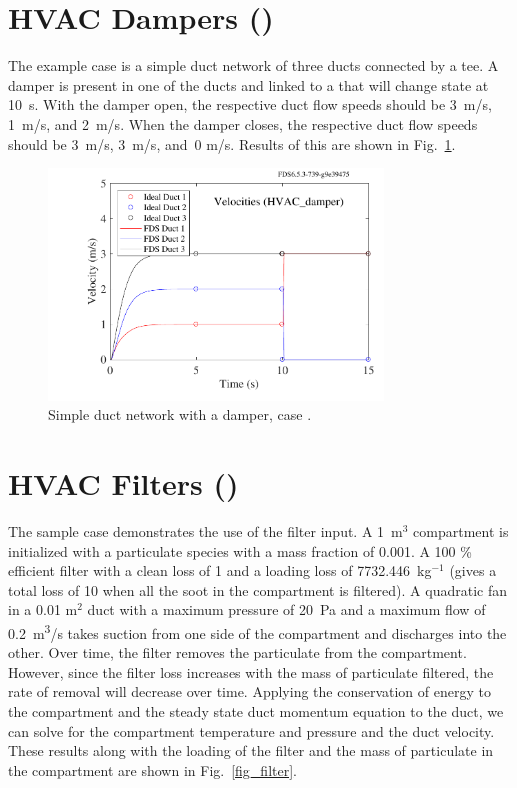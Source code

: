 \documentclass[11pt]{book}
\begin{document}
\clearpage

\section{HVAC Dampers (\texorpdfstring{}{HVAC\_damper})}
\label{HVAC_damper}

The  example case is a simple duct network of three ducts connected by a tee.  A damper is present in one of the ducts and linked to a  that will change state at 10~s.  With the damper open, the respective duct flow speeds should be 3~m/s, 1~m/s, and 2~m/s.  When the damper closes, the respective duct flow speeds should be 3~m/s, 3~m/s, and~0 m/s.  Results of this are shown in Fig.~\ref{fig:HVAC_damper}.

\begin{figure}[h!]
\centering
\includegraphics[width=3.5in]{SCRIPT_FIGURES/HVAC_damper}
\caption[Example case ]{Simple duct network with a damper, case .}
\label{fig:HVAC_damper}
\end{figure}


\clearpage

\section{HVAC Filters (\texorpdfstring{}{HVAC\_filter})}
\label{HVAC_filter}

The sample case  demonstrates the use of the filter input.  A 1~m$^3$ compartment is initialized with a particulate species with a mass fraction of 0.001.  A 100 \% efficient filter with a clean loss of 1 and a loading loss of 7732.446~kg$^{-1}$ (gives a total loss of 10 when all the soot in the compartment is filtered).  A quadratic fan in a 0.01 m$^2$ duct with a maximum pressure of 20~Pa and a maximum flow of 0.2~\si{m^3/s} takes suction from one side of the compartment and discharges into the other.  Over time, the filter removes the particulate from the compartment.  However, since the filter loss increases with the mass of particulate filtered, the rate of removal will decrease over time.  Applying the conservation of energy to the compartment and the steady state duct momentum equation to the duct, we can solve for the compartment temperature and pressure and the duct velocity.  These results along with the loading of the filter and the mass of particulate in the compartment are shown in Fig.~\ref{fig_filter}.
\end{document}
